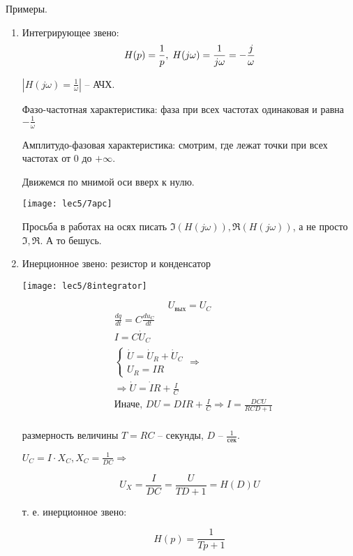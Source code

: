 \documentclass[main.tex]{subfiles}
\begin{document}
Примеры.

\begin{enumerate}[noitemsep]
	\item Интегрирующее звено:
    $$ H(p) = \frac{1}{p}, \thickspace H(j \omega) = \frac{1}{j \omega} = - \frac{j}{\omega} $$

    $|H(j \omega) = \frac{1}{\omega}|$ -- АЧХ.

    Фазо-частотная характеристика: фаза при всех частотах одинаковая и равна $ - \frac{1}{\omega} $

    Амплитудо-фазовая характеристика: смотрим, где лежат точки при всех частотах от $0$ до $ + \infty $.

    Движемся по мнимой оси вверх к нулю.

	\texttt{[image: lec5/7apc]}

	\begin{leftbar}
		Просьба в работах на осях писать $ \Im(H(j\omega)), \Re(H(j\omega))  $, а не просто $ \Im, \Re $.
        А то бешусь.
	\end{leftbar}

	\item Инерционное звено: резистор и конденсатор

	\texttt{[image: lec5/8integrator]}

	$$ U_{\text{вых}} = U_C $$
	\begin{align*}
		& \frac{dq}{dt} = C\frac{du_C}{dt} \\
		& I = C \dot U_C \\
		& \begin{cases}
            \dot U = \dot U_R + \dot U_C \\
            U_R = IR
        \end{cases}
          \Rightarrow\\
        & \Rightarrow \dot U = \dot I R + \frac{I}{C} \\
		& \text{Иначе, } DU = DIR + \frac{I}{C} \Rightarrow I = \frac{DCU}{RCD + 1} \\
	\end{align*}

    размерность величины $ T = RC $ -- секунды, $ D $ -- $ \frac{1}{\text{сек}} $.

    $ U_C = I \cdot X_C,  X_C = \frac{1}{DC} \Rightarrow $

    $$ U_X = \frac{I}{DC} = \frac{U}{TD + 1} = H(D) U $$

    т. е. инерционное звено:

	$$ \boxed{H(p) = \frac{1}{Tp + 1}} $$


\end{enumerate}
\end{document}
